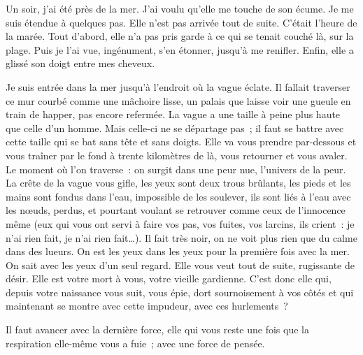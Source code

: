 {

Un soir, j'ai été près de la mer. J'ai voulu qu'elle me touche de son
écume. Je me suis étendue à quelques pas. Elle n'est pas arrivée tout
de suite. C'était l'heure de la marée. Tout d'abord, elle n'a pas
pris garde à ce qui se tenait couché là, sur la plage. Puis je l'ai
vue, ingénument, s'en étonner, jusqu'à me renifler. Enfin, elle a
glissé son doigt entre mes cheveux.

Je suis entrée dans la mer jusqu'à l'endroit où la vague éclate. Il
fallait traverser ce mur courbé comme une mâchoire lisse, un palais
que laisse voir une gueule en train de happer, pas encore refermée.
La vague a une taille à peine plus haute que celle d'un homme. Mais
celle-ci ne se départage pas~; il faut se battre avec cette taille
qui se bat sans tête et sans doigts. Elle va vous prendre par-dessous
et vous traîner par le fond à trente kilomètres de là, vous retourner
et vous avaler. Le moment où l'on traverse~: on surgit dans une peur
nue, l'univers de la peur. La crête de la vague vous gifle, les yeux
sont deux trous brûlants, les pieds et les mains sont fondus dans
l'eau, impossible de les soulever, ils sont liés à l'eau avec les
nœuds, perdus, et pourtant voulant se retrouver comme ceux de
l'innocence même (eux qui vous ont servi à faire vos pas, vos fuites,
vos larcins, ils crient~: je n'ai rien fait, je n'ai rien fait…). Il
fait très noir, on ne voit plus rien que du calme dans des lueurs. On
est les yeux dans les yeux pour la première fois avec la mer. On sait
avec les yeux d'un seul regard. Elle vous veut tout de suite,
rugissante de désir. Elle est votre mort à vous, votre vieille
gardienne. C'est donc elle qui, depuis votre naissance vous suit,
vous épie, dort sournoisement à vos côtés et qui maintenant se montre
avec cette impudeur, avec ces hurlements~?

Il faut avancer avec la dernière force, elle qui vous reste une fois
que la respiration elle-même vous a fuie~; avec une force de pensée.

}
